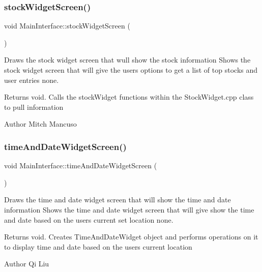 \subsubsection{\texorpdfstring{stock\+Widget\+Screen()}{stockWidgetScreen()}}
{\footnotesize\ttfamily void Main\+Interface\+::stock\+Widget\+Screen (\begin{DoxyParamCaption}{ }\end{DoxyParamCaption})}



Draws the stock widget screen that wull show the stock information  Shows the stock widget screen that will give the users options to get a list of top stocks and user entries  none. 

\begin{DoxyReturn}{Returns}
void. Calls the stock\+Widget functions within the Stock\+Widget.\+cpp class to pull information 
\end{DoxyReturn}
\begin{DoxyAuthor}{Author}
Mitch Mancuso 
\end{DoxyAuthor}
\mbox{\label{class_main_interface_a1ed374c9076deb2d73626122825bb6f2}} 
\subsubsection{\texorpdfstring{time\+And\+Date\+Widget\+Screen()}{timeAndDateWidgetScreen()}}
{\footnotesize\ttfamily void Main\+Interface\+::time\+And\+Date\+Widget\+Screen (\begin{DoxyParamCaption}{ }\end{DoxyParamCaption})}



Draws the time and date widget screen that will show the time and date information  Shows the time and date widget screen that will give show the time and date based on the user\textquotesingle{}s current set location  none. 

\begin{DoxyReturn}{Returns}
void. Creates Time\+And\+Date\+Widget object and performs operations on it to display time and date based on the user\textquotesingle{}s current location 
\end{DoxyReturn}
\begin{DoxyAuthor}{Author}
Qi Liu 
\end{DoxyAuthor}
\mbox{\label{class_main_interface_a8ab8c45d7aa780c1c8f0f6c40c15c133}} 

